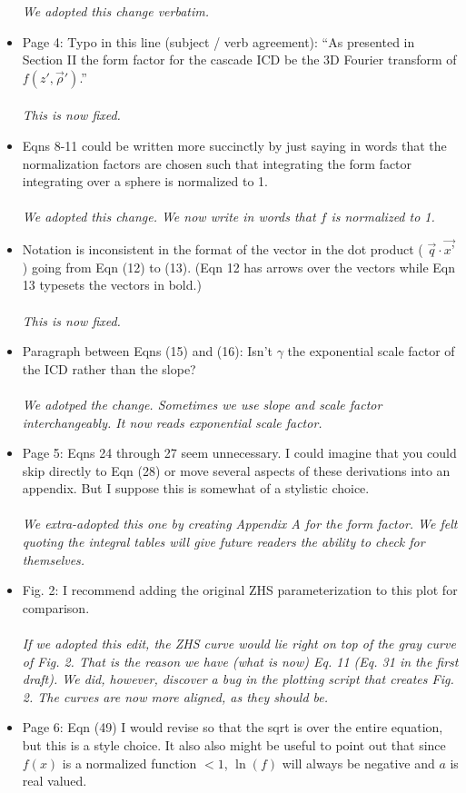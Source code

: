 \documentclass[12pt]{article}
\begin{document}
\begin{itemize}
\textit{We adopted this change verbatim.}
\item Page 4: Typo in this line (subject / verb agreement): ``As presented in Section II the form factor for the cascade ICD be the 3D Fourier transform of $f(z', \vec{\rho}')$.'' \\ \\
\textit{This is now fixed.}
\item Eqns 8-11 could be written more succinctly by just saying in words that the normalization factors are chosen such that integrating the form factor integrating over a sphere is normalized to 1. \\ \\
\textit{We adopted this change.  We now write in words that $f$ is normalized to 1.}
\item Notation is inconsistent in the format of the vector in the dot product ( $\vec{q} \cdot \vec{x’}$) going from Eqn (12) to (13). (Eqn 12 has arrows over the vectors while Eqn 13 typesets the vectors in bold.) \\ \\
\textit{This is now fixed.}
\item Paragraph between Eqns (15) and (16): Isn’t $\gamma$ the exponential scale factor of the ICD rather than the slope? \\ \\
\textit{We adotped the change.  Sometimes we use slope and scale factor interchangeably.  It now reads exponential scale factor.}
\item Page 5: Eqns 24 through 27 seem unnecessary. I could imagine that you could skip directly to Eqn (28) or move several aspects of these derivations into an appendix. But I suppose this is somewhat of a stylistic choice. \\ \\
\textit{We extra-adopted this one by creating Appendix A for the form factor.  We felt quoting the integral tables will give future readers the ability to check for themselves.}
\item Fig. 2: I recommend adding the original ZHS parameterization to this plot for comparison. \\ \\
\textit{If we adopted this edit, the ZHS curve would lie right on top of the gray curve of Fig. 2.  That is the reason we have (what is now) Eq. 11 (Eq. 31 in the first draft).  We did, however, discover a bug in the plotting script that creates Fig. 2.  The curves are now more aligned, as they should be.}
\item Page 6: Eqn (49) I would revise so that the sqrt is over the entire equation, but this is a style choice. It also also might be useful to point out that since $f(x)$ is a normalized function $<1$, $\ln(f)$ will always be negative and $a$ is real valued. \\ \\

\end{itemize}
\end{document}
